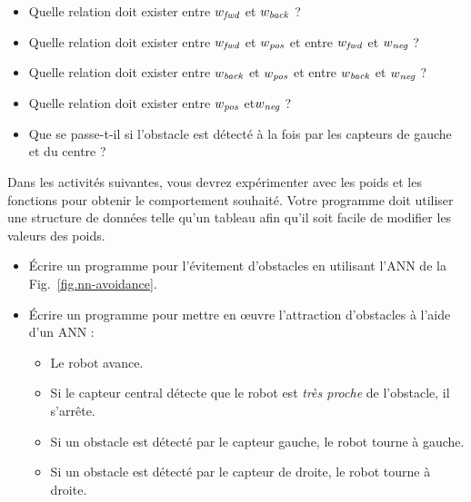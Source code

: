 \begin{framed}
\begin{itemize}
\item Quelle relation doit exister entre $w_{\textit{\scriptsize fwd}}$ et $w_{\textit{\scriptsize back}}$ ?
\item Quelle relation doit exister entre $w_{\textit{\scriptsize fwd}}$ et $w_{\textit{\scriptsize pos}}$ et entre $w_{\textit{\scriptsize fwd}}$ et $w_{\textit{\scriptsize neg}}$ ?
\item Quelle relation doit exister entre $w_{\textit{\scriptsize back}}$ et $w_{\textit{\scriptsize pos}}$ et entre $w_{\textit{\scriptsize back}}$ et $w_{\textit{\scriptsize neg}}$ ?
\item Quelle relation doit exister entre $w_{\textit{\scriptsize pos}}$ et$w_{\textit{\scriptsize neg}}$ ?
\item Que se passe-t-il si l'obstacle est détecté à la fois par les capteurs de gauche et du centre ?
\end{itemize}
\end{framed}

Dans les activités suivantes, vous devrez expérimenter avec les poids et les fonctions pour obtenir le comportement souhaité. Votre programme doit utiliser une structure de données telle qu'un tableau afin qu'il soit facile de modifier les valeurs des poids.

\begin{framed}
\begin{itemize}
\item Écrire un programme pour l'évitement d'obstacles en utilisant l'ANN de la Fig.~\ref{fig.nn-avoidance}.
\end{itemize}
\end{framed}

\begin{framed}
\begin{itemize}
\item Écrire un programme pour mettre en œuvre l'attraction d'obstacles à l'aide d'un ANN :
\begin{itemize}
\item Le robot avance.
\item Si le capteur central détecte que le robot est \emph{très proche} de l'obstacle, il s'arrête.
\item Si un obstacle est détecté par le capteur gauche, le robot tourne à gauche.
\item Si un obstacle est détecté par le capteur de droite, le robot tourne à droite.
\end{itemize}
\end{itemize}
\end{framed}

